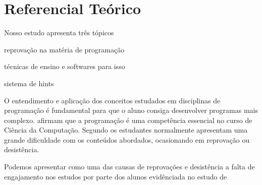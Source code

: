 \chapter{Referencial Teórico}

Nosso estudo apresenta três tópicos 

reprovação na matéria de programação

técnicas de ensino e softwares para isso

sistema de hints

O entendimento e aplicação dos conceitos estudados em disciplinas de programação é fundamental para que o aluno consiga desenvolver programas mais complexo. \cite{Helminen:2010:JPV:1879211.1879234} afirmam que a programação é uma competência essencial no curso de Ciência da Computação. Segundo \cite{bosse2015reprovaccoes} os estudantes normalmente apresentam uma grande dificuldade com os conteúdos abordados, ocasionando em reprovação ou desistência.

Podemos apresentar como uma das causas de reprovações e desistência a falta de engajamento nos estudos por parte dos alunos evidênciada no estudo de \cite{Sinclair:2015:MSE:2729094.2742586}